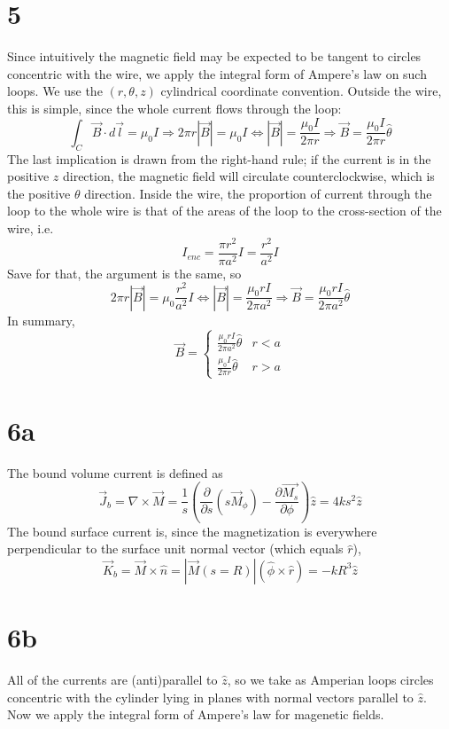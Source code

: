 \documentclass{article}
\begin{document}
\section*{5}
Since intuitively the magnetic field may be expected to be tangent to circles concentric with the wire, we apply the integral form of Ampere's law on such loops. We use the $(r,\theta,z)$ cylindrical coordinate convention.
Outside the wire, this is simple, since the whole current flows through the loop:
\[\int_C\vec{B}\cdot d\vec{l}=\mu_0 I\Rightarrow 2\pi r|\vec{B}|=\mu_0 I\Leftrightarrow |\vec{B}|=\frac{\mu_0 I}{2\pi r} \Rightarrow \vec{B}=\frac{\mu_0I}{2\pi r}\hat{\theta}\]
The last implication is drawn from the right-hand rule; if the current is in the positive $z$ direction, the magnetic field will circulate counterclockwise, which is the positive $\theta$ direction.
Inside the wire, the proportion of current through the loop to the whole wire is that of the areas of the loop to the cross-section of the wire, i.e.
\[I_{enc}=\frac{\pi r^2}{\pi a^2}I=\frac{r^2}{a^2}I\]
Save for that, the argument is the same, so
\[2\pi r|\vec{B}|=\mu_0\frac{r^2}{a^2}I\Leftrightarrow |\vec{B}|=\frac{\mu_0rI}{2\pi a^2}\Rightarrow \vec{B}=\frac{\mu_0rI}{2\pi a^2}\hat{\theta}\]
In summary,
\[\vec{B}=\begin{cases}
    \frac{\mu_0 rI}{2\pi a^2}\hat{\theta} & r < a \\
    \frac{\mu_0 I}{2\pi r}\hat{\theta} & r > a
  \end{cases}\]

\section*{6a}
The bound volume current is defined as
\[\vec{J}_b=\nabla\times\vec{M}=\frac{1}{s}\left(\frac{\partial}{\partial s}(s\vec{M}_\phi)-\frac{\partial \vec{M_s}}{\partial \phi}\right)\hat{z}=4ks^2\hat{z  }\]
The bound surface current is, since the magnetization is everywhere perpendicular to the surface unit normal vector (which equals $\hat{r}$),
\[\vec{K}_b=\vec{M}\times\hat{n}=|\vec{M}(s=R)|(\hat{\phi}\times\hat{r})=-kR^3\hat{z}\]

\section*{6b}
All of the currents are (anti)parallel to $\hat{z}$, so we take as Amperian loops circles concentric with the cylinder lying in planes with normal vectors parallel to $\hat{z}$. Now we apply the integral form of Ampere's law for magenetic fields.
\end{document}
